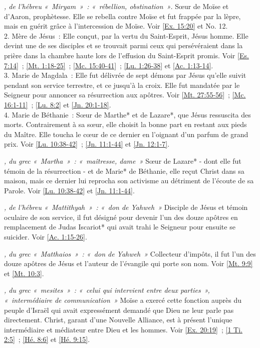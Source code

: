\begin{multicols}{2}
\textit{, de l'hébreu «~Miryam~»~: «~rébellion, obstination~»}. Sœur de Moïse et d'Aaron, prophètesse. Elle se rebella contre Moïse et fut frappée par la lèpre, mais en guérit grâce à l'intercession de Moïse. Voir \vref{Ex. 15:20} et No. 12.
\\2. Mère de Jésus~: Elle conçut, par la vertu du Saint-Esprit, Jésus homme. Elle devint une de ses disciples et se trouvait parmi ceux qui persévéraient dans la prière dans la chambre haute lors de l'effusion du Saint-Esprit promis. Voir \vref{Es. 7:14}~; \vref{Mt. 1:18-25}~; \vref{Mc. 15:40-41}~; \vref{Lu. 1:26-38} et \vref{Ac. 1:13-14}.
\\3. Marie de Magdala~: Elle fut délivrée de sept démons par Jésus qu'elle suivit pendant son service terrestre, et ce jusqu'à la croix. Elle fut mandatée par le Seigneur pour annoncer sa résurrection aux apôtres. Voir \vref{Mt. 27:55-56}~; \vref{Mc. 16:1-11}~; \vref{Lu. 8:2} et \vref{Jn. 20:1-18}.
\\4. Marie de Béthanie~: Sœur de Marthe* et de Lazare*, que Jésus ressuscita des morts. Contrairement à sa sœur, elle choisit la bonne part en restant aux pieds du Maître. Elle toucha le cœur de ce dernier en l'oignant d'un parfum de grand prix. Voir \vref{Lu. 10:38-42}~; \vref{Jn. 11:1-44} et \vref{Jn. 12:1-7}.

\textit{, du grec «~Martha~»~: «~maîtresse, dame~»}\newline
Sœur de Lazare* - dont elle fut témoin de la résurrection - et de Marie* de Béthanie, elle reçut Christ dans sa maison, mais ce dernier lui reprocha son activisme au détriment de l'écoute de sa Parole. Voir \vref{Lu. 10:38-42} et \vref{Jn. 11:1-44}.

\textit{, de l'hébreu «~Mattithyah~»~: «~don de Yahweh~»}\newline
Disciple de Jésus et témoin oculaire de son service, il fut désigné pour devenir l'un des douze apôtres en remplacement de Judas Iscariot* qui avait trahi le Seigneur pour ensuite se suicider. Voir \vref{Ac. 1:15-26}.

\textit{, du grec «~Matthaios~»~: «~don de Yahweh~»}\newline
Collecteur d'impôts, il fut l'un des douze apôtres de Jésus et l'auteur de l'évangile qui porte son nom. Voir \vref{Mt. 9:9} et \vref{Mt. 10:3}.

\textit{, du grec «~mesites~»~: «~celui qui intervient entre deux parties~», «~intermédiaire de communication~»}\newline
Moïse a exercé cette fonction auprès du peuple d'Israël qui avait expressément demandé que Dieu ne leur parle pas directement. Christ, garant d'une Nouvelle Alliance, est à présent l'unique intermédiaire et médiateur entre Dieu et les hommes. Voir \vref{Ex. 20:19}~; \vref{1 Ti. 2:5}~; \vref{Hé. 8:6} et \vref{Hé. 9:15}.


\end{multicols}
